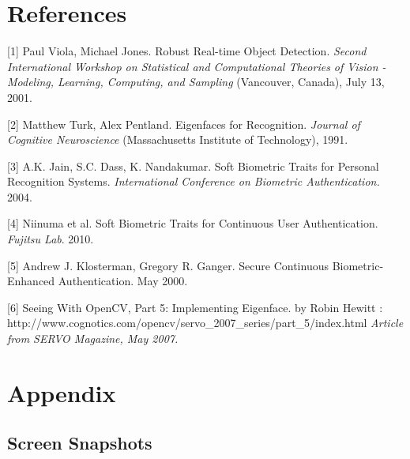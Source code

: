 \documentclass[12pt]{article}			%
\begin{document}
\section{ References }
[1] Paul Viola, Michael Jones. Robust Real-time Object Detection. \textit {Second International Workshop on Statistical and Computational Theories of Vision - Modeling, Learning, Computing, and Sampling} (Vancouver, Canada), July 13, 2001. 

[2] Matthew Turk, Alex Pentland. Eigenfaces for Recognition. \textit {Journal of Cognitive Neuroscience} (Massachusetts Institute of Technology), 1991. 

[3] A.K. Jain, S.C. Dass, K. Nandakumar. Soft Biometric Traits for Personal Recognition Systems. \textit{ International Conference on Biometric Authentication.} 2004.
 
[4] Niinuma et al. Soft Biometric Traits for Continuous User Authentication. \textit{Fujitsu Lab}. 2010.

[5] Andrew J. Klosterman, Gregory R. Ganger. Secure Continuous Biometric-Enhanced Authentication. May 2000.

[6] Seeing With OpenCV, Part 5: Implementing Eigenface. by Robin Hewitt : http://www.cognotics.com/opencv/servo_2007_series/part_5/index.html \textit { Article from SERVO Magazine, May 2007. } 

\section{ Appendix }
\subsection{ Screen Snapshots}

\end{document}
